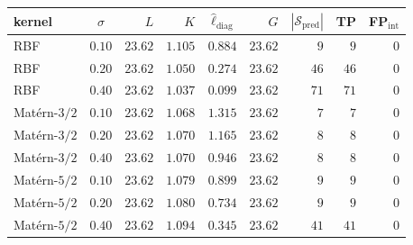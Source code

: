 \small
\setlength{\tabcolsep}{5pt}
\begin{tabular}{lcrrrrrrr}
\toprule
kernel          & $\sigma$ & $L$     & $K$     & $\hat\ell_{\mathrm{diag}}$  & $G$     & $|\mathcal{S}_{\mathrm{pred}}|$ & TP & FP$_{\mathrm{int}}$ \\
\midrule
RBF             & $0.10$   & $23.62$ & $1.105$ & $0.884$ & $23.62$ & $ 9$ & $ 9$ & $0$ \\
RBF             & $0.20$   & $23.62$ & $1.050$ & $0.274$ & $23.62$ & $46$ & $46$ & $0$ \\
RBF             & $0.40$   & $23.62$ & $1.037$ & $0.099$ & $23.62$ & $71$ & $71$ & $0$ \\
Mat\'ern-$3/2$  & $0.10$   & $23.62$ & $1.068$ & $1.315$ & $23.62$ & $ 7$ & $ 7$ & $0$ \\
Mat\'ern-$3/2$  & $0.20$   & $23.62$ & $1.070$ & $1.165$ & $23.62$ & $ 8$ & $ 8$ & $0$ \\
Mat\'ern-$3/2$  & $0.40$   & $23.62$ & $1.070$ & $0.946$ & $23.62$ & $ 8$ & $ 8$ & $0$ \\
Mat\'ern-$5/2$  & $0.10$   & $23.62$ & $1.079$ & $0.899$ & $23.62$ & $ 9$ & $ 9$ & $0$ \\
Mat\'ern-$5/2$  & $0.20$   & $23.62$ & $1.080$ & $0.734$ & $23.62$ & $ 9$ & $ 9$ & $0$ \\
Mat\'ern-$5/2$  & $0.40$   & $23.62$ & $1.094$ & $0.345$ & $23.62$ & $41$ & $41$ & $0$ \\
\bottomrule
\end{tabular}
